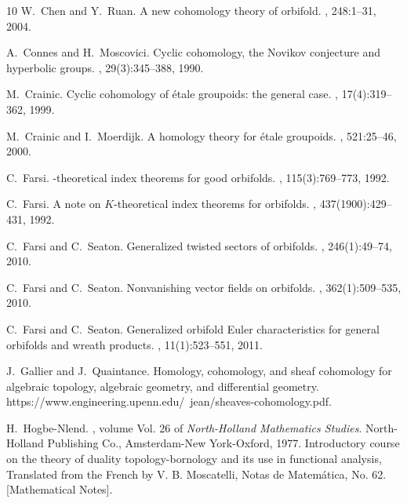 \documentclass[a4paper]{amsart}
\newcommand\<{\langle}
\renewcommand\>{\rangle}
\theoremstyle{definition}
\theoremstyle{remark}
\begin{document}
\begin{thebibliography}{10}
W.~Chen and Y.~Ruan.
\newblock A new cohomology theory of orbifold.
, 248:1--31, 2004.

A.~Connes and H.~Moscovici.
\newblock Cyclic cohomology, the {N}ovikov conjecture and hyperbolic groups.
, 29(3):345--388, 1990.

M.~Crainic.
\newblock Cyclic cohomology of \'etale groupoids: the general case.
, 17(4):319--362, 1999.

M.~Crainic and I.~Moerdijk.
\newblock A homology theory for \'etale groupoids.
, 521:25--46, 2000.

C.~Farsi.
-theoretical index theorems for good orbifolds.
, 115(3):769--773, 1992.

C.~Farsi.
\newblock A note on {$K$}-theoretical index theorems for orbifolds.
, 437(1900):429--431, 1992.

C.~Farsi and C.~Seaton.
\newblock Generalized twisted sectors of orbifolds.
, 246(1):49--74, 2010.

C.~Farsi and C.~Seaton.
\newblock Nonvanishing vector fields on orbifolds.
, 362(1):509--535, 2010.

C.~Farsi and C.~Seaton.
\newblock Generalized orbifold {E}uler characteristics for general orbifolds
  and wreath products.
, 11(1):523--551, 2011.

J.~Gallier and J.~Quaintance.
\newblock Homology, cohomology, and sheaf cohomology for algebraic topology,
  algebraic geometry, and differential geometry.
\newblock https://www.engineering.upenn.edu/~jean/sheaves-cohomology.pdf.

H.~Hogbe-Nlend.
, volume Vol. 26 of {\em
  North-Holland Mathematics Studies}.
\newblock North-Holland Publishing Co., Amsterdam-New York-Oxford, 1977.
\newblock Introductory course on the theory of duality topology-bornology and
  its use in functional analysis, Translated from the French by V. B.
  Moscatelli, Notas de Matem\'atica, No. 62. [Mathematical Notes].


\end{thebibliography}
\end{document}
